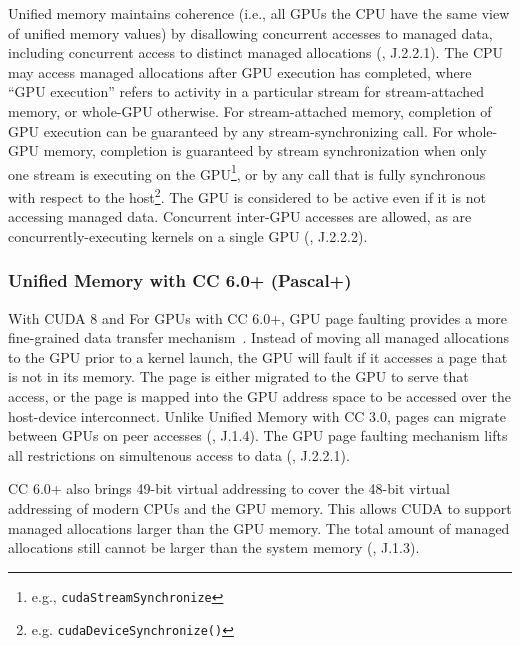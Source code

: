 Unified memory maintains coherence (i.e., all GPUs the CPU have the same view of unified memory values) by disallowing concurrent accesses to managed data, including concurrent access to distinct managed allocations (\cite{nvidia2014cuda60}, J.2.2.1).
The CPU may access managed allocations after GPU execution has completed, where ``GPU execution'' refers to activity in a particular stream for stream-attached memory, or whole-GPU otherwise.
For stream-attached memory, completion of GPU execution can be guaranteed by any stream-synchronizing call.
For whole-GPU memory, completion is guaranteed by stream synchronization when only one stream is executing on the GPU\footnote{e.g., \texttt{cudaStreamSynchronize}}, or by any call that is fully synchronous with respect to the host\footnote{e.g. \texttt{cudaDeviceSynchronize()}}.
The GPU is considered to be active even if it is not accessing managed data.
Concurrent inter-GPU accesses are allowed, as are concurrently-executing kernels on a single GPU (\cite{nvidia2014cuda60}, J.2.2.2).


\subsubsection{Unified Memory with CC 6.0+ (Pascal+)}

With CUDA 8 and For GPUs with CC 6.0+, GPU page faulting provides a more fine-grained data transfer mechanism~\cite{nvidia2017cuda80}.
Instead of moving all managed allocations to the GPU prior to a kernel launch, the GPU will fault if it accesses a page that is not in its memory.
The page is either migrated to the GPU to serve that access, or the page is mapped into the GPU address space to be accessed over the host-device interconnect.
Unlike Unified Memory with CC 3.0, pages can migrate between GPUs on peer accesses (\cite{nvidia2017cuda80}, J.1.4).
The GPU page faulting mechanism lifts all restrictions on simultenous access to data (\cite{nvidia2017cuda80}, J.2.2.1).

CC 6.0+ also brings 49-bit virtual addressing to cover the 48-bit virtual addressing of modern CPUs and the GPU memory.
This allows CUDA to support managed allocations larger than the GPU memory.
The total amount of managed allocations still cannot be larger than the system memory (\cite{nvidia2017cuda80}, J.1.3).


